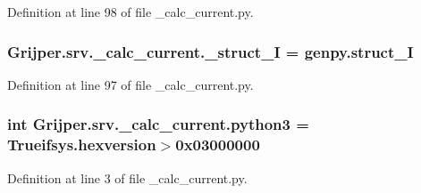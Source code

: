 Definition at line 98 of file \-\_\-calc\-\_\-current.\-py.

\subsubsection[{\-\_\-struct\-\_\-\-I}]{\setlength{\rightskip}{0pt plus 5cm}Grijper.\-srv.\-\_\-calc\-\_\-current.\-\_\-struct\-\_\-\-I = genpy.\-struct\-\_\-\-I}\label{namespaceGrijper_1_1srv_1_1__calc__current_a93684a774b695c714f644a4e1e19cd88}


Definition at line 97 of file \-\_\-calc\-\_\-current.\-py.

\subsubsection[{python3}]{\setlength{\rightskip}{0pt plus 5cm}int Grijper.\-srv.\-\_\-calc\-\_\-current.\-python3 = Trueifsys.\-hexversion$>$0x03000000}\label{namespaceGrijper_1_1srv_1_1__calc__current_af09f08bccb5d17a0f80d35f334ee0db2}


Definition at line 3 of file \-\_\-calc\-\_\-current.\-py.

